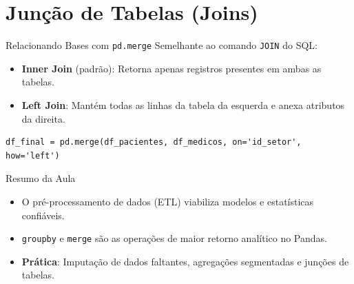 \documentclass[aspectratio=169, 10pt]{beamer}
\begin{document}
\section{Junção de Tabelas (Joins)}

\begin{frame}[fragile]{Relacionando Bases com \texttt{pd.merge}}
  Semelhante ao comando \texttt{JOIN} do SQL:
  \begin{itemize}
    \item \textbf{Inner Join} (padrão): Retorna apenas registros presentes em ambas as tabelas.
    \item \textbf{Left Join}: Mantém todas as linhas da tabela da esquerda e anexa atributos da direita.
  \end{itemize}
  \begin{lstlisting}
df_final = pd.merge(df_pacientes, df_medicos, on='id_setor', how='left')
  \end{lstlisting}
\end{frame}

\begin{frame}{Resumo da Aula}
  \begin{itemize}
    \item O pré-processamento de dados (ETL) viabiliza modelos e estatísticas confiáveis.
    \item \texttt{groupby} e \texttt{merge} são as operações de maior retorno analítico no Pandas.
    \item \textbf{Prática}: Imputação de dados faltantes, agregações segmentadas e junções de tabelas.
  \end{itemize}
\end{frame}
\end{document}

